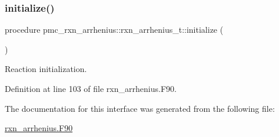\subsubsection{\texorpdfstring{initialize()}{initialize()}}
{\footnotesize\ttfamily procedure pmc\+\_\+rxn\+\_\+arrhenius\+::rxn\+\_\+arrhenius\+\_\+t\+::initialize (\begin{DoxyParamCaption}{ }\end{DoxyParamCaption})\hspace{0.3cm}{\ttfamily [private]}}



Reaction initialization. 



Definition at line 103 of file rxn\+\_\+arrhenius.\+F90.



The documentation for this interface was generated from the following file\+:\begin{DoxyCompactItemize}
\item 
\mbox{\hyperlink{rxn__arrhenius_8_f90}{rxn\+\_\+arrhenius.\+F90}}\end{DoxyCompactItemize}
